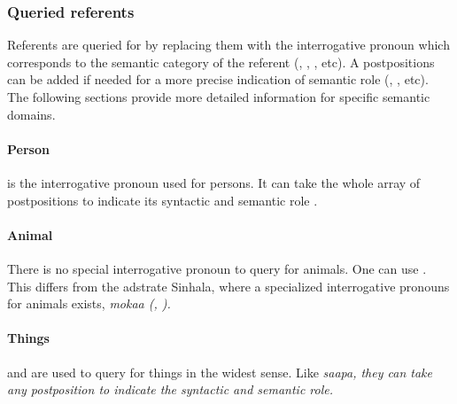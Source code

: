 \subsubsection{Queried referents}\label{sec:func:Queriedreferents}
Referents are queried for by replacing them with the interrogative pronoun    which corresponds to the semantic category of the referent (, , , etc). A  postpositions can be added if needed for a more precise indication of semantic role (, , etc). The following sections provide more detailed information for specific semantic domains.

\paragraph{Person}\label{sec:func:q:Person}

 is the interrogative pronoun used for persons. It can take the whole array of postpositions to indicate its syntactic and semantic role .


\paragraph{Animal}\label{sec:func:q:Animal}
There is no special interrogative pronoun to query for animals. One can use . This differs from the adstrate Sinhala, where a specialized interrogative pronouns for animals exists, \em mokaa \em (\citet[29]{Garusinghe1962},  \citet[259]{Karunatillake2004}).




\paragraph{Things}\label{sec:func:q:Things}
   and   are used to query for things in the widest sense.   Like \em saapa\em, they can take any postposition to indicate the syntactic and semantic role.

